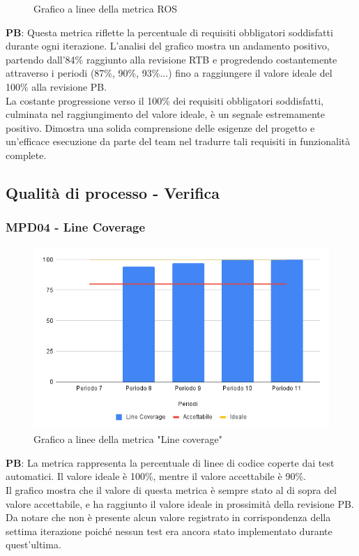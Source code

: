 \documentclass[10pt]{article}
\begin{document}
\begin{justify}
\begin{figure}[H]
  \centering
  \caption{Grafico a linee della metrica ROS}
\end{figure}

\textbf{PB}: Questa metrica riflette la percentuale di requisiti obbligatori soddisfatti durante ogni iterazione. L'analisi del grafico mostra un andamento positivo, partendo dall'84\% raggiunto alla revisione RTB e progredendo costantemente attraverso i periodi (87\%, 90\%, 93\%...) fino a raggiungere il valore ideale del 100\% alla revisione PB.\\
La costante progressione verso il 100\% dei requisiti obbligatori soddisfatti, culminata nel raggiungimento del valore ideale, è un segnale estremamente positivo. Dimostra una solida comprensione delle esigenze del progetto e un'efficace esecuzione da parte del team nel tradurre tali requisiti in funzionalità complete.


\subsection{Qualità di processo - Verifica}
\subsubsection{MPD04 - Line Coverage}

\begin{figure}[H]
  \centering
  \includegraphics[width=0.9\linewidth]{LineCoverage.png}
  \caption{Grafico a linee della metrica "Line coverage"}
\end{figure}

\textbf{PB}: La metrica rappresenta la percentuale di linee di codice coperte dai test automatici. Il valore ideale è 100\%, mentre il valore accettabile è 90\%.\\
Il grafico mostra che il valore di questa metrica è sempre stato al di sopra del valore accettabile, e ha raggiunto il valore ideale in prossimità della revisione PB.\\
Da notare che non è presente alcun valore registrato in corrispondenza della settima iterazione poiché nessun test era ancora stato implementato durante quest'ultima.\\



\end{justify}
\end{document}
